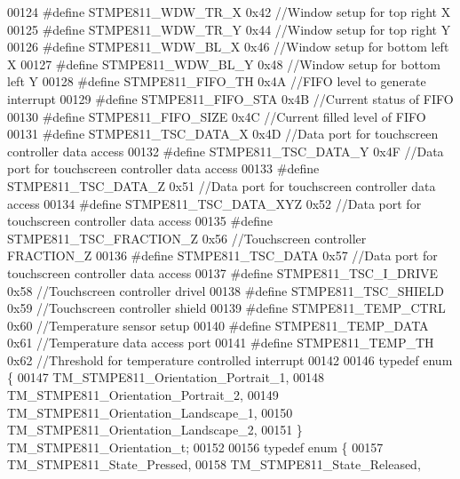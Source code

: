 \begin{DoxyCode}
00124 \textcolor{preprocessor}{#define STMPE811\_WDW\_TR\_X               0x42    //Window setup for top right X}
00125 \textcolor{preprocessor}{#define STMPE811\_WDW\_TR\_Y               0x44    //Window setup for top right Y}
00126 \textcolor{preprocessor}{#define STMPE811\_WDW\_BL\_X               0x46    //Window setup for bottom left X}
00127 \textcolor{preprocessor}{#define STMPE811\_WDW\_BL\_Y               0x48    //Window setup for bottom left Y}
00128 \textcolor{preprocessor}{#define STMPE811\_FIFO\_TH                0x4A    //FIFO level to generate interrupt}
00129 \textcolor{preprocessor}{#define STMPE811\_FIFO\_STA               0x4B    //Current status of FIFO}
00130 \textcolor{preprocessor}{#define STMPE811\_FIFO\_SIZE              0x4C    //Current filled level of FIFO}
00131 \textcolor{preprocessor}{#define STMPE811\_TSC\_DATA\_X             0x4D    //Data port for touchscreen controller data access}
00132 \textcolor{preprocessor}{#define STMPE811\_TSC\_DATA\_Y             0x4F    //Data port for touchscreen controller data access}
00133 \textcolor{preprocessor}{#define STMPE811\_TSC\_DATA\_Z             0x51    //Data port for touchscreen controller data access}
00134 \textcolor{preprocessor}{#define STMPE811\_TSC\_DATA\_XYZ           0x52    //Data port for touchscreen controller data access}
00135 \textcolor{preprocessor}{#define STMPE811\_TSC\_FRACTION\_Z         0x56    //Touchscreen controller FRACTION\_Z}
00136 \textcolor{preprocessor}{#define STMPE811\_TSC\_DATA               0x57    //Data port for touchscreen controller data access}
00137 \textcolor{preprocessor}{#define STMPE811\_TSC\_I\_DRIVE            0x58    //Touchscreen controller drivel}
00138 \textcolor{preprocessor}{#define STMPE811\_TSC\_SHIELD             0x59    //Touchscreen controller shield}
00139 \textcolor{preprocessor}{#define STMPE811\_TEMP\_CTRL              0x60    //Temperature sensor setup}
00140 \textcolor{preprocessor}{#define STMPE811\_TEMP\_DATA              0x61    //Temperature data access port}
00141 \textcolor{preprocessor}{#define STMPE811\_TEMP\_TH                0x62    //Threshold for temperature controlled interrupt}
00142 
00146 \textcolor{keyword}{typedef} \textcolor{keyword}{enum} \{
00147     TM\_STMPE811\_Orientation\_Portrait\_1,
00148     TM\_STMPE811\_Orientation\_Portrait\_2,
00149     TM\_STMPE811\_Orientation\_Landscape\_1,
00150     TM\_STMPE811\_Orientation\_Landscape\_2,
00151 \} TM\_STMPE811\_Orientation\_t;
00152 
00156 \textcolor{keyword}{typedef} \textcolor{keyword}{enum} \{
00157     TM\_STMPE811\_State\_Pressed,
00158     TM\_STMPE811\_State\_Released,

\end{DoxyCode}
